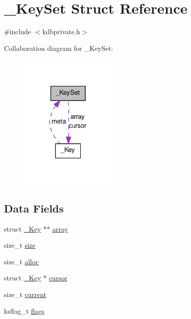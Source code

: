 \hypertarget{struct__KeySet}{
\section{\_\-KeySet Struct Reference}
\label{struct__KeySet}
}


{\ttfamily \#include $<$kdbprivate.h$>$}



Collaboration diagram for \_\-KeySet:
\nopagebreak
\begin{figure}[H]
\begin{center}
\leavevmode
\includegraphics[width=137pt]{struct__KeySet__coll__graph}
\end{center}
\end{figure}
\subsection*{Data Fields}
\begin{DoxyCompactItemize}
\item 
struct \hyperlink{struct__Key}{\_\-Key} $\ast$$\ast$ \hyperlink{struct__KeySet_ae1d1a4e056f483d59503d85d639e186b}{array}
\item 
size\_\-t \hyperlink{struct__KeySet_aecb83d70eff913f1332593c179185125}{size}
\item 
size\_\-t \hyperlink{struct__KeySet_ac421dbe2138bb4317996a480a6dae904}{alloc}
\item 
struct \hyperlink{struct__Key}{\_\-Key} $\ast$ \hyperlink{struct__KeySet_ae1f826d1e8848e43e4432d1bc8316e65}{cursor}
\item 
size\_\-t \hyperlink{struct__KeySet_a68da1e55ecaf7e8d555cf61c8fda95d9}{current}
\item 
ksflag\_\-t \hyperlink{struct__KeySet_aa8da9b8e25533547f9eeb4e5c3227c74}{flags}
\end{DoxyCompactItemize}


